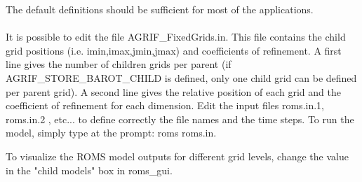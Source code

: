 The default definitions should be sufficient for most of the applications.
\\
\\
It is possible to edit the file AGRIF\_FixedGrids.in. 
This file contains the child grid positions
(i.e. imin,imax,jmin,jmax) and coefficients of refinement. A first line
gives the number of children grids per parent (if AGRIF\_STORE\_BAROT\_CHILD
is defined, only one child grid can be defined per parent grid). A second
line gives the relative position of each grid and the coefficient of refinement 
for each dimension. 
Edit the input files roms.in.1, roms.in.2 , etc... to define correctly the 
file names and the time steps. To run the model, simply type at the prompt:
roms roms.in.

To visualize the ROMS model outputs for different grid levels, 
change the value in the "child models" box
in roms\_gui.



